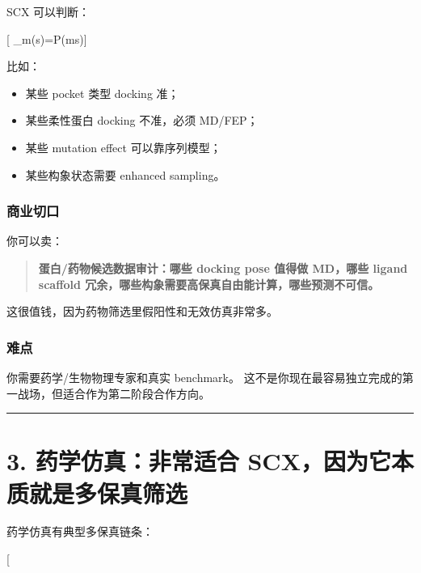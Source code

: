 \documentclass[
  12pt,
]{ctexart}
\providecommand{\tightlist}{%
  \setlength{\itemsep}{0pt}\setlength{\parskip}{0pt}}
\begin{document}
SCX 可以判断：

{[}
\_m(s)=P(ms){]}

比如：

\begin{itemize}
\tightlist
\item
  某些 pocket 类型 docking 准；
\item
  某些柔性蛋白 docking 不准，必须 MD/FEP；
\item
  某些 mutation effect 可以靠序列模型；
\item
  某些构象状态需要 enhanced sampling。
\end{itemize}

\subsubsection{商业切口}\label{ux5546ux4e1aux5207ux53e3}

你可以卖：

\begin{quote}
\textbf{蛋白/药物候选数据审计：哪些 docking pose 值得做 MD，哪些 ligand
scaffold 冗余，哪些构象需要高保真自由能计算，哪些预测不可信。}
\end{quote}

这很值钱，因为药物筛选里假阳性和无效仿真非常多。

\subsubsection{难点}\label{ux96beux70b9}

你需要药学/生物物理专家和真实 benchmark。
这不是你现在最容易独立完成的第一战场，但适合作为第二阶段合作方向。

\begin{center}\rule{0.5\linewidth}{0.5pt}\end{center}

\section{3. 药学仿真：非常适合
SCX，因为它本质就是多保真筛选}\label{ux836fux5b66ux4effux771fux975eux5e38ux9002ux5408-scxux56e0ux4e3aux5b83ux672cux8d28ux5c31ux662fux591aux4fddux771fux7b5bux9009}

药学仿真有典型多保真链条：

{[}  \rightarrow {} \rightarrow {}
\rightarrow {} \rightarrow {} \rightarrow
\text{wet lab}{]}
\end{document}
